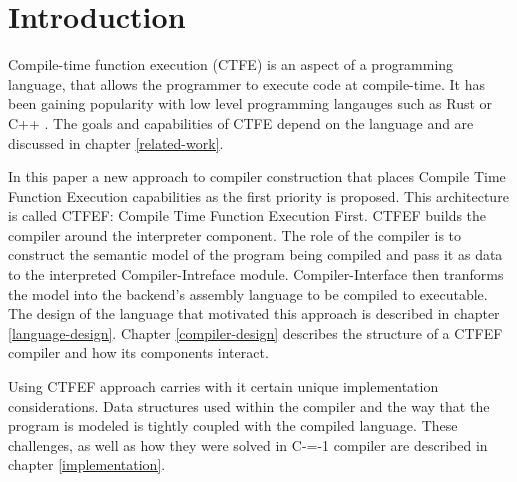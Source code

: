 \section{Introduction}


Compile-time function execution (CTFE) is an aspect of a programming language, that allows the programmer to execute code at compile-time.
It has been gaining popularity with low level programming langauges such as Rust \cite{rust} or C++ \cite{ISO:cpp98}.
The goals and capabilities of CTFE depend on the language and are discussed in chapter \ref{related-work}.

In this paper a new approach to compiler construction that places Compile Time Function Execution capabilities as the first priority is proposed.
This architecture is called CTFEF: Compile Time Function Execution First.
CTFEF builds the compiler around the interpreter component.
The role of the compiler is to construct the semantic model of the program being compiled and pass it as data to the interpreted Compiler-Intreface module.
Compiler-Interface then tranforms the model into the backend's assembly language to be compiled to executable.
The design of the language that motivated this approach is described in chapter \ref{language-design}. %
Chapter \ref{compiler-design} describes the structure of a CTFEF compiler and how its components interact.

Using CTFEF approach carries with it certain unique implementation considerations.
Data structures used within the compiler and the way that the program is modeled is tightly coupled with the compiled language.
These challenges, as well as how they were solved in C-=-1 compiler are described in chapter \ref{implementation}.
